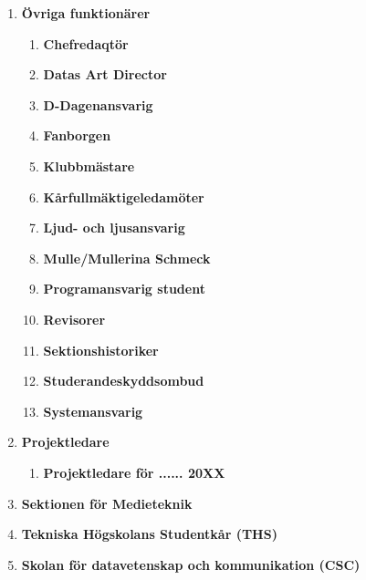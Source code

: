 \documentclass{dagordning}
\begin{document}
\begin{enumerate}
        \item \textbf{Övriga funktionärer}
      \begin{enumerate}
      	\item \textbf{Chefredaqtör}
      	\item \textbf{Datas Art Director}
      	\item \textbf{D-Dagenansvarig}
        \item \textbf{Fanborgen}
        \item \textbf{Klubbmästare}
        \item \textbf{Kårfullmäktigeledamöter}
        \item \textbf{Ljud- och ljusansvarig}
        \item \textbf{Mulle/Mullerina Schmeck}
        \item \textbf{Programansvarig student}
        \item \textbf{Revisorer}
        \item \textbf{Sektionshistoriker}
        \item \textbf{Studerandeskyddsombud}
        \item \textbf{Systemansvarig}
        \end{enumerate}
      
    \item \textbf{Projektledare}
      \begin{enumerate}
        \item \textbf{Projektledare för ...... 20XX}

      \end{enumerate}

 
    \item \textbf{Sektionen för Medieteknik}
    \item \textbf{Tekniska Högskolans Studentkår (THS)}    
    \item \textbf{Skolan för datavetenskap och kommunikation (CSC)}
  \end{enumerate}






\end{document}
